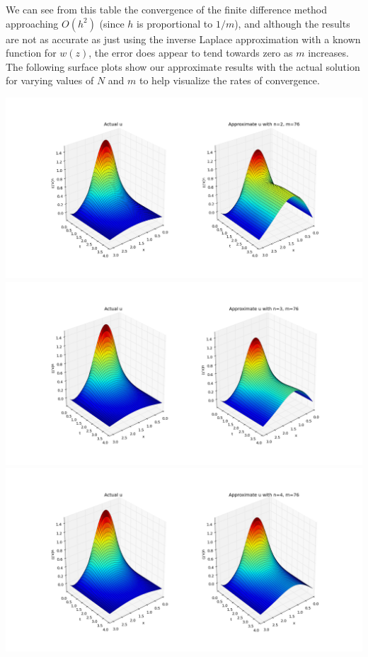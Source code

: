 \documentclass[letterpaper, 12pt]{article}
\begin{document}
	We can see from this table the convergence of the finite difference method approaching $O(h^2)$ (since $h$ is proportional to $1/m$), and although the results are not as accurate as just using the inverse Laplace approximation with a known function for $w(z)$, the error does appear to tend towards zero as $m$ increases. The following surface plots show our approximate results with the actual solution for varying values of $N$ and $m$ to help visualize the rates of convergence. \\\vspace{5cm}
	
	\includegraphics[trim = 6.5cm 1cm 6cm 2cm, width=\linewidth]{ProjectFiles/results/plots/n2m76.png} \\\vspace{2cm}
	\includegraphics[trim = 6.5cm 3cm 6cm 2cm, width=\linewidth]{ProjectFiles/results/plots/n3m76.png} \\\vspace{2cm}
	\includegraphics[trim = 6.5cm 3cm 6cm 2cm, width=\linewidth]{ProjectFiles/results/plots/n4m76.png} \\\vspace{2cm}
\end{document}
